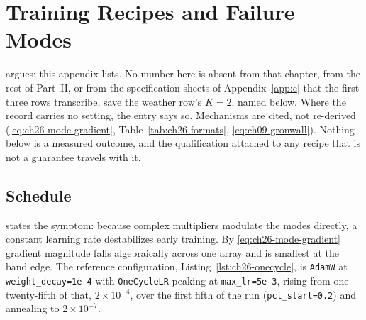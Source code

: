 
\chapter{Training Recipes and Failure Modes}\label{app:d}

 argues; this appendix
lists. No number here is absent from that chapter, from the rest of Part~II, or
from the specification sheets of Appendix~\ref{app:c} that the first three rows
transcribe, save the weather row's $K=2$, named below. Where the record carries no
setting, the entry says so. Mechanisms are cited, not
re-derived (\eqref{eq:ch26-mode-gradient}, Table~\ref{tab:ch26-formats},
\eqref{eq:ch09-gronwall}). Nothing below is a measured outcome, and the qualification attached to any recipe
that is not a guarantee travels with it.

\section{Schedule}
\label{sec:appd-schedule}

 states the symptom:
because complex multipliers modulate the modes directly, a constant learning rate
destabilizes early training. By
\eqref{eq:ch26-mode-gradient} gradient magnitude falls algebraically across one
array and is smallest at the band edge. The reference configuration,
Listing~\ref{lst:ch26-onecycle}, is \texttt{AdamW} at \texttt{weight\_decay=1e-4}
with \texttt{OneCycleLR} peaking at \texttt{max\_lr=5e-3}, rising from one
twenty-fifth of that, $2\times10^{-4}$, over the first fifth of the run
(\texttt{pct\_start=0.2}) and annealing to $2\times10^{-7}$.

